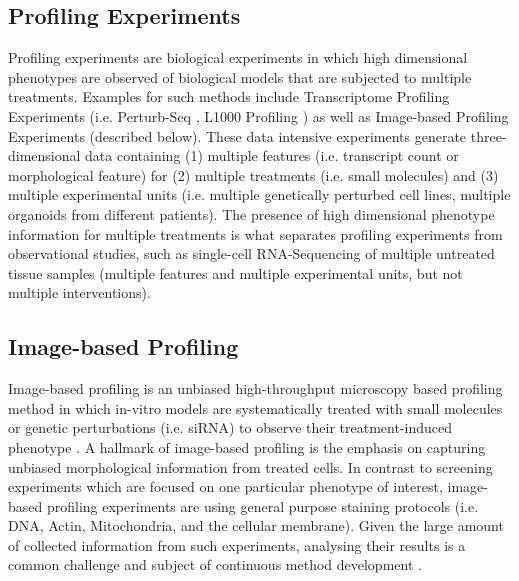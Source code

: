 \begin{flushleft}
\section{Profiling Experiments} 

Profiling experiments are biological experiments in which high dimensional phenotypes are observed of biological models that are subjected to multiple treatments. Examples for such methods include Transcriptome Profiling Experiments (i.e. Perturb-Seq \citep{dixitPerturbSeqDissectingMolecular2016}, L1000 Profiling \citep{subramanianNextGenerationConnectivity2017}) as well as Image-based Profiling Experiments \cite{caicedoApplicationsImagebasedProfiling2016} (described below). These data intensive experiments generate three-dimensional data containing (1) multiple features (i.e. transcript count or morphological feature) for (2) multiple treatments (i.e. small molecules) and (3) multiple experimental units (i.e. multiple genetically perturbed cell lines, multiple organoids from different patients). The presence of high dimensional phenotype information for multiple treatments is what separates profiling experiments from observational studies, such as single-cell RNA-Sequencing of multiple untreated tissue samples (multiple features and multiple experimental units, but not multiple interventions). 

\subsection{Image-based Profiling}

Image-based profiling is an unbiased high-throughput microscopy based profiling method in which in-vitro models are systematically treated with small molecules or genetic perturbations (i.e. siRNA) to observe their treatment-induced phenotype \citep{caicedoApplicationsImagebasedProfiling2016}. A hallmark of image-based profiling is the emphasis on capturing unbiased morphological information from treated cells. In contrast to screening experiments which are focused on one particular phenotype of interest, image-based profiling experiments are using general purpose staining protocols (i.e. DNA, Actin, Mitochondria, and the cellular membrane). Given the large amount of collected information from such experiments, analysing their results is a common challenge and subject of continuous method development \citep{chandrasekaranImagebasedProfilingDrug2021}. 
\par


\end{flushleft}
